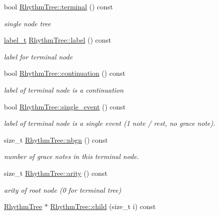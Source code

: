 \begin{DoxyCompactItemize}
\mbox{\label{group__output_ga4f875cf76d3ebc8270a471ef57e93ddd}} 
bool \mbox{\hyperlink{group__output_ga4f875cf76d3ebc8270a471ef57e93ddd}{Rhythm\+Tree\+::terminal}} () const
\begin{DoxyCompactList}\small\item\em single node tree \end{DoxyCompactList}\item 
\mbox{\hyperlink{group__output_ga22fde970e635fcf63962743b2d5c441d}{label\+\_\+t}} \mbox{\hyperlink{group__output_ga40e2aa462ed42fa46d3beafca9dbc350}{Rhythm\+Tree\+::label}} () const
\begin{DoxyCompactList}\small\item\em label for terminal node \end{DoxyCompactList}\item 
bool \mbox{\hyperlink{group__output_ga1ca015dec36fa32ff6d66aaad10f4eb0}{Rhythm\+Tree\+::continuation}} () const
\begin{DoxyCompactList}\small\item\em label of terminal node is a continuation \end{DoxyCompactList}\item 
bool \mbox{\hyperlink{group__output_gabd793b78f71fb62edb13497e0a13f48c}{Rhythm\+Tree\+::single\+\_\+event}} () const
\begin{DoxyCompactList}\small\item\em label of terminal node is a single event (1 note / rest, no grace note). \end{DoxyCompactList}\item 
size\+\_\+t \mbox{\hyperlink{group__output_gaaaf06fe2227a6598b109a72d89afa8d7}{Rhythm\+Tree\+::nbgn}} () const
\begin{DoxyCompactList}\small\item\em number of grace notes in this terminal node. \end{DoxyCompactList}\item 
\mbox{\label{group__output_ga813a6feea3e6aa565fa0aed29e970a4e}} 
size\+\_\+t \mbox{\hyperlink{group__output_ga813a6feea3e6aa565fa0aed29e970a4e}{Rhythm\+Tree\+::arity}} () const
\begin{DoxyCompactList}\small\item\em arity of root node (0 for terminal tree) \end{DoxyCompactList}\item 
\mbox{\hyperlink{classRhythmTree}{Rhythm\+Tree}} $\ast$ \mbox{\hyperlink{group__output_ga130dd34b9f3e0db4ad4f185181895dbd}{Rhythm\+Tree\+::child}} (size\+\_\+t i) const

\end{DoxyCompactItemize}
